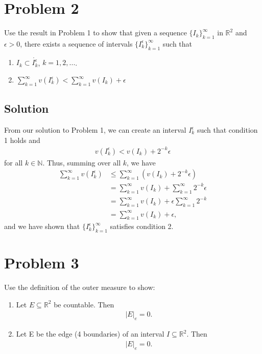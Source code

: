 \documentclass[10pt,a4paper]{article}
\theoremstyle{theorem}
\theoremstyle{definition}
\begin{document}
\section*{Problem 2}
Use the result in Problem 1 to show that given a sequence $\{I_k\}_{k=1}^\infty$ in $\mathbb{R}^2$ and $\epsilon > 0$, there exists a sequence of intervals $\{I_k^\epsilon\}_{k=1}^\infty$ such that 
\begin{enumerate}
\item $I_k \subset \mathring{I_k^\epsilon}$, $k=1,2,...$.
\item $\sum_{k=1}^\infty v(I_k^\epsilon) < \sum_{k=1}^\infty v(I_k) + \epsilon$
\end{enumerate}
\subsection*{Solution}
From our solution to Problem 1, we can create an interval $I_k^\epsilon$ such that condition 1 holds and
\begin{align*}
v(I_k^\epsilon) < v(I_k) + 2^{-k} \epsilon
\end{align*}
for all $k \in \mathbb{N}$. Thus, summing over all $k$, we have
\begin{align*}
\sum_{k=1}^\infty v(I_k^\epsilon) &\leq \sum_{k=1}^\infty (v(I_k) +  2^{-k} \epsilon)\\
&= \sum_{k=1}^\infty v(I_k) +  \sum_{k=1}^\infty 2^{-k} \epsilon\\
&= \sum_{k=1}^\infty v(I_k) +  \epsilon \sum_{k=1}^\infty 2^{-k} \\
&= \sum_{k=1}^\infty v(I_k) + \epsilon,
\end{align*}
and we have shown that $\{I_k^\epsilon\}_{k=1}^\infty$ satisfies condition 2.

\section*{Problem 3}
Use the definition of the outer measure to show:
\begin{enumerate}
\item Let $E \subseteq \mathbb{R}^2$ be countable. Then
\begin{align*}
|E|_e = 0.
\end{align*}
\item Let E be the edge (4 boundaries) of  an interval $I \subseteq \mathbb{R}^2$. Then 
\begin{align*}
|E|_e = 0.
\end{align*}
\end{enumerate}
\end{document}
